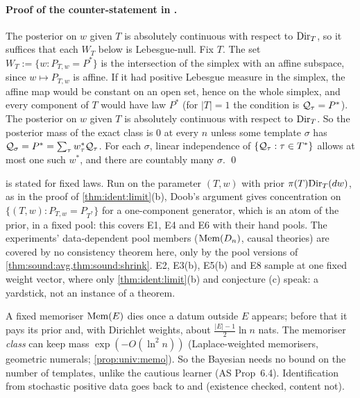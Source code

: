 \paragraph{Proof of the counter-statement in .} The posterior on $w$ given $T$ is absolutely continuous with respect to $\mathrm{Dir}_T$, so it suffices that each $W_T$ below is Lebesgue-null. Fix $T$. The set $W_T:=\{w:P_{T,w}=P^*\}$ is the intersection of the simplex with an affine subspace, since $w\mapsto P_{T,w}$ is affine. If it had positive Lebesgue measure in the simplex, the affine map would be constant on an open set, hence on the whole simplex, and every component of $T$ would have law $P^*$ (for $|T|=1$ the condition is $\mathcal{Q}_\tau=P^*$). The posterior on $w$ given $T$ is absolutely continuous with respect to $\mathrm{Dir}_T$. So the posterior mass of the exact class is $0$ at every $n$ unless some template $\sigma$ has $\mathcal{Q}_\sigma=P^*=\sum_\tau w^*_\tau\mathcal{Q}_\tau$. For each $\sigma$, linear independence of $\{\mathcal{Q}_\tau:\tau\in T^*\}$ allows at most one such $w^*$, and there are countably many $\sigma$. \qed

\begin{remark}\label{rem:ident:x5}
 is stated for fixed laws. Run on the parameter $(T,w)$ with prior $\pi(T)\mathrm{Dir}_T(dw)$, as in the proof of \cref{thm:ident:limit}(b), Doob's argument gives concentration on $\{(T,w):P_{T,w}=P_{T^*}\}$ for a one-component generator, which is an atom of the prior, in a fixed pool: this covers E1, E4 and E6 with their hand pools. The experiments' data-dependent pool members ($\mathrm{Mem}(D_n)$, causal theories) are covered by no consistency theorem here, only by the pool versions of \cref{thm:sound:avg,thm:sound:shrink}. E2, E3(b), E5(b) and E8 sample at one fixed weight vector, where only \cref{thm:ident:limit}(b) and conjecture (c) speak: a yardstick, not an instance of a theorem.
\end{remark}

\begin{remark}\label{rem:ident:memo}
A fixed memoriser $\mathrm{Mem}(E)$ dies once a datum outside $E$ appears; before that it pays its prior and, with Dirichlet weights, about $\frac{|E|-1}2\ln n$ nats. The memoriser \emph{class} can keep mass $\exp(-O(\ln^2n))$ (Laplace-weighted memorisers, geometric numerals; \cref{prop:univ:memo}). So the Bayesian needs no bound on the number of templates, unlike the cautious learner (AS Prop~6.4). Identification from stochastic positive data goes back to \citet{horning1969study} and \citet{angluin1988identifying} (existence checked, content not).
\end{remark}

